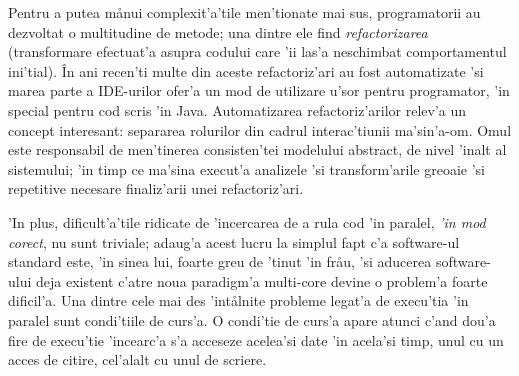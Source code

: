 Pentru a putea m\aa nui complexit'a'tile men'tionate mai sus, programatorii au
dezvoltat o multitudine de metode; una dintre ele find \emph{refactorizarea}
(transformare efectuat'a asupra codului care 'ii las'a neschimbat
comportamentul ini'tial). \^In ani recen'ti multe din aceste refactoriz'ari au
fost automatizate 'si marea parte a IDE-urilor ofer'a un mod de utilizare u'sor
pentru programator, 'in special pentru cod scris 'in Java. Automatizarea
refactoriz'arilor relev'a un concept interesant: separarea rolurilor din cadrul
interac'tiunii ma'sin'a-om. Omul este responsabil de men'tinerea consisten'tei
modelului abstract, de nivel 'inalt al sistemului; 'in timp ce ma'sina execut'a
analizele 'si transform'arile greoaie 'si repetitive necesare finaliz'arii unei
refactoriz'ari.

'In plus, dificult'a'tile ridicate de 'incercarea de a rula cod 'in paralel,
\emph{'in mod corect}, nu sunt triviale; adaug'a acest lucru la simplul fapt c'a
software-ul standard este, 'in sinea lui, foarte greu de 'tinut 'in fr\aa u, 'si
aducerea software-ului deja existent c'atre noua paradigm'a multi-core devine o
problem'a foarte dificil'a. Una dintre cele mai des 'int\aa lnite probleme
legat'a de execu'tia 'in paralel sunt condi'tiile de curs'a. O condi'tie de
curs'a apare atunci c'and dou'a fire de execu'tie 'incearc'a s'a acceseze
acelea'si date 'in acela'si timp, unul cu un acces de citire, cel'alalt cu unul
de scriere.

